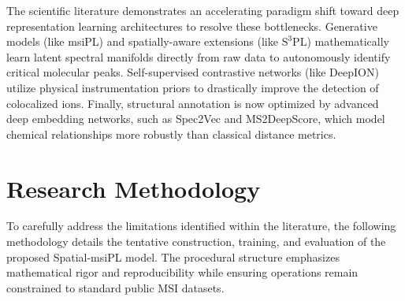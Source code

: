 \documentclass[
12pt, %
oneside, %
english, %
onehalfspacing, %
nolistspacing, %
headsepline, %
]{MastersDoctoralThesis} %
\begin{document}
The scientific literature demonstrates an accelerating paradigm shift toward deep representation learning architectures to resolve these bottlenecks. Generative models (like msiPL) and spatially-aware extensions (like $\text{S}^{3}\text{PL}$) mathematically learn latent spectral manifolds directly from raw data to autonomously identify critical molecular peaks. Self-supervised contrastive networks (like DeepION) utilize physical instrumentation priors to drastically improve the detection of colocalized ions. Finally, structural annotation is now optimized by advanced deep embedding networks, such as Spec2Vec and MS2DeepScore, which model chemical relationships more robustly than classical distance metrics.

\chapter{Research Methodology}



To carefully address the limitations identified within the literature, the following methodology details the tentative construction, training, and evaluation of the proposed Spatial-msiPL model. The procedural structure emphasizes mathematical rigor and reproducibility while ensuring operations remain constrained to standard public MSI datasets.
\end{document}
